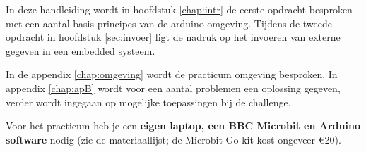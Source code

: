 In deze handleiding wordt in hoofdstuk \ref{chap:intr} de eerste opdracht besproken met een aantal basis principes van de arduino omgeving.
Tijdens de tweede opdracht in hoofdstuk \ref{sec:invoer} ligt de nadruk op het invoeren van externe gegeven in een embedded systeem.


In de appendix \ref{chap:omgeving}  wordt de practicum omgeving besproken. In appendix \ref{chap:apB} wordt voor een aantal problemen een oplossing gegeven, verder wordt ingegaan op mogelijke toepassingen bij de challenge.

Voor het practicum heb je een \textbf{eigen laptop, een BBC Microbit en Arduino software} nodig 
(zie de materiaallijst; de Microbit Go kit kost ongeveer \euro{}20). 